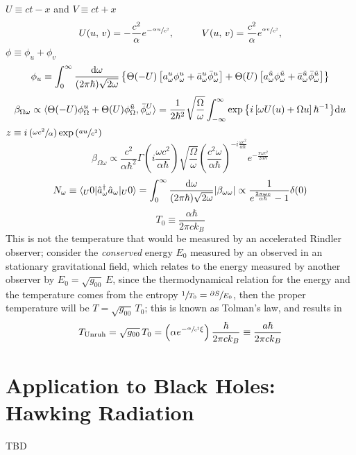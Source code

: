 $U\equiv ct-x$ and $V\equiv ct+x$
\begin{subequations}
	\begin{gather}
		U(u,\,v)=-\frac{c^2}{\alpha}e^{-\sfrac{\alpha u}{c^2}},\hspace{1.0cm} V(u,\,v)=\frac{c^2}{\alpha}e^{\sfrac{\alpha v}{c^2}},
	\end{gather}
\end{subequations}
$\phi\equiv\phi_u+\phi_v$
\begin{equation}
	\phi_u\equiv\int_0^\infty \frac{\text{d} \omega}{(2\pi\hbar)\sqrt{2\omega}}\left\{\Theta(-U)\left[a^u_\omega\phi_\omega^u+\bar a^u_\omega\bar \phi_\omega^u \right]+\Theta(U)\left[a^{\tilde u}_\omega\phi_\omega^{\tilde u}+\bar a^{\tilde u}_\omega\bar \phi_\omega^{\tilde u} \right]\right\}
\end{equation}
\begin{equation}
	\beta_{\Omega\omega}\propto \langle \Theta(-U)\phi^u_\Omega+\Theta(U)\phi^{\tilde u}_\Omega,\bar\phi_\omega^{U}\rangle=\frac{1}{2\hbar^2}\sqrt{\frac{\Omega}{\omega}}\int_{-\infty}^\infty\exp{\left\{i\left[\omega U(u)+\Omega u\right]\hbar^{-1}\right\}}\text{d} u
\end{equation}
$z\equiv i\left(\sfrac{\omega c^2}{\alpha}\right)\exp{\left(\sfrac{a u}{c^2}\right)}$
\begin{equation}
	\beta_{\Omega\omega}\propto \frac{c^2}{\alpha\hbar^2}\Gamma\left(i\frac{\omega c^2}{\alpha\hbar }\right)\sqrt{\frac{\Omega}{\omega}}\left(\frac{c^2\omega}{\alpha\hbar }\right)^{-i\frac{\omega c^2}{\alpha\hbar}}e^{-\frac{\pi\omega c^2}{2\alpha\hbar}}
\end{equation}
\begin{equation}
	N_\omega\equiv\langle_U 0|\hat{a}_\omega^\dagger\hat{a}_\omega|_U0\rangle=\int_0^\infty\frac{\text{d}\omega}{(2\pi\hbar)\sqrt{2\omega}}|\beta_{\omega\omega}|\propto\frac{1}{e^{\frac{2\pi\omega c}{\alpha\hbar}}-1}\delta(0)
\end{equation}
\begin{equation}
	T_0\equiv \frac{\alpha\hbar}{2\pi ck_B}
\end{equation}
This is not the temperature that would be measured by an accelerated Rindler observer; consider the \textit{conserved} energy $E_0$ measured by an observed in an stationary gravitational field, which relates to the energy measured by another observer by $E_0=\sqrt{g_00}\,E$, since the thermodynamical relation for the energy and the temperature comes from the entropy $\sfrac{1}{T_0}=\sfrac{\partial S}{E_0}$, then the proper temperature will be $T=\sqrt{g_{00}}\,T_0$; this is known as Tolman's law, and results in
\begin{equation}
	T_{\text{Unruh}}=\sqrt{g_{00}}\,T_0=\left(\alpha e^{-\sfrac{\alpha}{c^2}\xi}\right)\frac{\hbar}{2\pi ck_B}\equiv \frac{a\hbar}{2\pi ck_B}
\end{equation}
\section{Application to Black Holes: Hawking Radiation}
TBD
